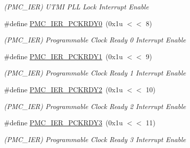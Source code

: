 \begin{DoxyCompactItemize}
\begin{DoxyCompactList}\small\item\em (P\+M\+C\+\_\+\+I\+ER) U\+T\+MI P\+LL Lock Interrupt Enable \end{DoxyCompactList}\item 
\mbox{\label{group__SAMV71__PMC_gaf4dc63611af547b0f83ab274c2d4752e}} 
\#define \mbox{\hyperlink{group__SAMV71__PMC_gaf4dc63611af547b0f83ab274c2d4752e}{P\+M\+C\+\_\+\+I\+E\+R\+\_\+\+P\+C\+K\+R\+D\+Y0}}~(0x1u $<$$<$ 8)
\begin{DoxyCompactList}\small\item\em (P\+M\+C\+\_\+\+I\+ER) Programmable Clock Ready 0 Interrupt Enable \end{DoxyCompactList}\item 
\mbox{\label{group__SAMV71__PMC_gaeeab0f98979c5b8f870eeee57982c244}} 
\#define \mbox{\hyperlink{group__SAMV71__PMC_gaeeab0f98979c5b8f870eeee57982c244}{P\+M\+C\+\_\+\+I\+E\+R\+\_\+\+P\+C\+K\+R\+D\+Y1}}~(0x1u $<$$<$ 9)
\begin{DoxyCompactList}\small\item\em (P\+M\+C\+\_\+\+I\+ER) Programmable Clock Ready 1 Interrupt Enable \end{DoxyCompactList}\item 
\mbox{\label{group__SAMV71__PMC_ga24a074ed0f89ac6b1509943b02659d3b}} 
\#define \mbox{\hyperlink{group__SAMV71__PMC_ga24a074ed0f89ac6b1509943b02659d3b}{P\+M\+C\+\_\+\+I\+E\+R\+\_\+\+P\+C\+K\+R\+D\+Y2}}~(0x1u $<$$<$ 10)
\begin{DoxyCompactList}\small\item\em (P\+M\+C\+\_\+\+I\+ER) Programmable Clock Ready 2 Interrupt Enable \end{DoxyCompactList}\item 
\mbox{\label{group__SAMV71__PMC_gacae87261dc9fb52ec79a1a380fcdf8fd}} 
\#define \mbox{\hyperlink{group__SAMV71__PMC_gacae87261dc9fb52ec79a1a380fcdf8fd}{P\+M\+C\+\_\+\+I\+E\+R\+\_\+\+P\+C\+K\+R\+D\+Y3}}~(0x1u $<$$<$ 11)
\begin{DoxyCompactList}\small\item\em (P\+M\+C\+\_\+\+I\+ER) Programmable Clock Ready 3 Interrupt Enable \end{DoxyCompactList}\item 
\mbox{\label{group__SAMV71__PMC_ga31be9f0cda08e0f5d90c39f9a45e3401}} 

\end{DoxyCompactItemize}
